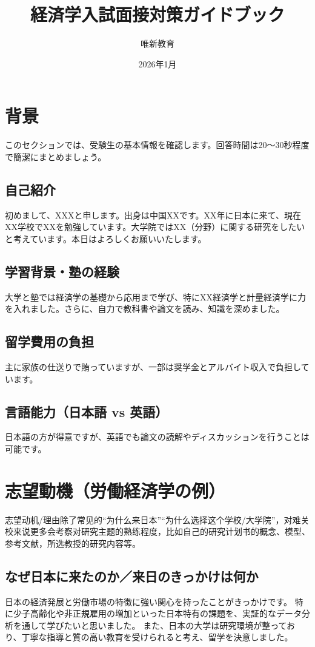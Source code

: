 \documentclass[xelatex,a4paper,base=11pt,ja=standard,jafont=noto]{bxjsreport}
\title{経済学入試面接対策ガイドブック}
\author{唯新教育}
\date{2026年1月}
\begin{document}
\maketitle
\tableofcontents

\chapter{背景}
このセクションでは、受験生の基本情報を確認します。回答時間は20～30秒程度で簡潔にまとめましょう。

\section{自己紹介}
初めまして、XXXと申します。出身は中国XXです。XX年に日本に来て、現在XX学校でXXを勉強しています。大学院ではXX（分野）に関する研究をしたいと考えています。本日はよろしくお願いいたします。

\section{学習背景・塾の経験}
大学と塾では経済学の基礎から応用まで学び、特にXX経済学と計量経済学に力を入れました。さらに、自力で教科書や論文を読み、知識を深めました。

\section{留学費用の負担}
主に家族の仕送りで賄っていますが、一部は奨学金とアルバイト収入で負担しています。

\section{言語能力（日本語 vs 英語）}
日本語の方が得意ですが、英語でも論文の読解やディスカッションを行うことは可能です。

\chapter{志望動機（労働経済学の例）}
志望动机/理由除了常见的“为什么来日本”“为什么选择这个学校/大学院”，对难关校来说更多会考察对研究主题的熟练程度，比如自己的研究计划书的概念、模型、参考文献，所选教授的研究内容等。
\section{なぜ日本に来たのか／来日のきっかけは何か}
日本の経済発展と労働市場の特徴に強い関心を持ったことがきっかけです。
特に少子高齢化や非正規雇用の増加といった日本特有の課題を、実証的なデータ分析を通して学びたいと思いました。
また、日本の大学は研究環境が整っており、丁寧な指導と質の高い教育を受けられると考え、留学を決意しました。
\end{document}
